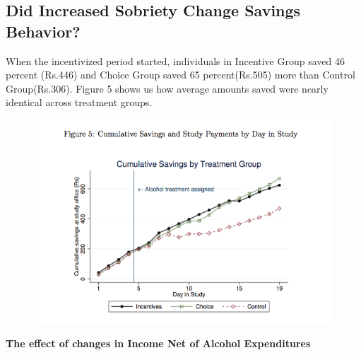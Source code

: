 \documentclass[a4paper,12pt]{article}
\begin{document}
\subsection{Did Increased Sobriety Change Savings Behavior?}
When the incentivized period started, individuals in Incentive Group saved 46 percent (Rs.446) and Choice Group saved 65 percent(Rs.505) more than Control Group(Rs.306). Figure 5 shows us how average amounts saved were nearly identical across treatment groups.

\begin{figure}[h]
\centering
\includegraphics[width=1\textwidth]{Figure5.png}
\caption{\label{fig:Figure5}}
\end{figure}

\textbf{The effect of changes in Income Net of Alcohol Expenditures}
\end{document}
